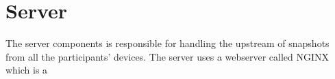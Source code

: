 \section{Server}
The server components is responsible for handling the upstream of snapshots from all the participants' devices. The server uses a webserver called NGINX which is a 